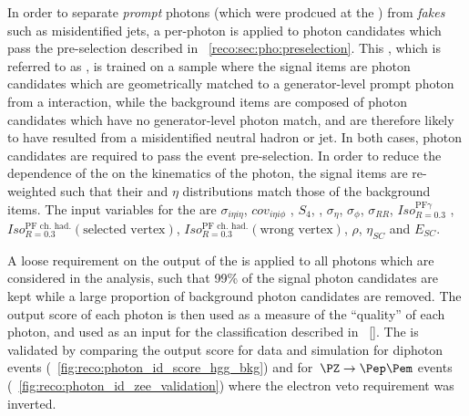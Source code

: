 In order to separate \emph{prompt} photons (which were prodcued at the \PV) from \emph{fakes} such as misidentified jets, a per-photon \BDT is applied to photon candidates which pass the pre-selection described in \Sec~\ref{reco:sec:pho:preselection}. This \BDT, which is referred to as \PhoIdBdt, is trained on a \gammaJet sample where the signal items are photon candidates which are geometrically matched to a generator-level prompt photon from a \pp interaction, while the background items are composed of photon candidates which have no generator-level photon match, and are therefore likely to have resulted from a misidentified neutral hadron or jet. In both cases, photon candidates are required to pass the event pre-selection. In order to reduce the dependence of the \PhoIdBdt on the kinematics of the photon, the signal items are re-weighted such that their \pT and $\eta$ distributions match those of the background items. The input variables for the \PhoIdBdt are $\sigma_{i\eta i\eta}$, $cov_{i\eta i\phi}$ , $S_{4} $, \RNINE , $\sigma_{\eta} $, $\sigma_{\phi }$, $\sigma_{RR}$, $Iso^{\textrm{PF}\gamma}_{R=0.3}$ , $Iso^{\textrm{PF ch. had.}}_{R=0.3}(\textrm{selected vertex})$, $Iso^{\textrm{PF ch. had.}}_{R=0.3}(\textrm{wrong vertex})$, $\rho$, $\eta_{SC}$ and $E_{SC}$. 

A loose requirement on the output of the \PhoIdBdt is applied to all photons which are considered in the analysis, such that 99\% of the signal photon candidates are kept while a large proportion of background photon candidates are removed. The \PhoIdBdt output score of each photon is then used as a measure of the ``quality'' of each photon, and used as an input for the classification described in \Sec~\ref{}.
The \PhoIdBdt is validated by comparing the output score for data and simulation for diphoton events (\Fig~\ref{fig:reco:photon_id_score_hgg_bkg}) and for $\Zee$ events (\Fig~\ref{fig:reco:photon_id_zee_validation}) where the electron veto requirement was inverted.


